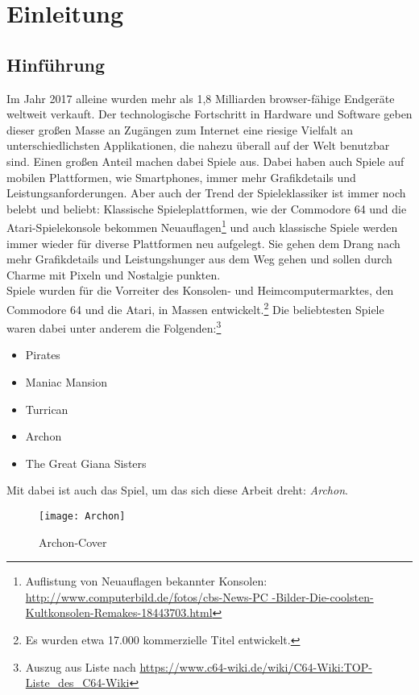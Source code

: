 \chapter{Einleitung}
\label{cha:Einleitung}

\section{Hinführung}
\label{sec:hinfuhrung}
Im Jahr 2017 alleine wurden mehr als 1,8 Milliarden browser-fähige Endgeräte weltweit verkauft.\cite{statista_absatz} Der technologische Fortschritt in Hardware und Software geben dieser großen Masse an Zugängen zum Internet eine riesige Vielfalt an unterschiedlichsten Applikationen, die nahezu überall auf der Welt benutzbar sind. Einen großen Anteil machen dabei Spiele aus. Dabei haben auch Spiele auf mobilen Plattformen, wie Smartphones, immer mehr Grafikdetails und Leistungsanforderungen. Aber auch der Trend der Spieleklassiker ist immer noch belebt und beliebt: Klassische Spieleplattformen, wie der Commodore 64 und die Atari-Spielekonsole bekommen Neuauflagen\footnote{Auflistung von Neuauflagen bekannter Konsolen:\\ \url{http://www.computerbild.de/fotos/cbs-News-PC
-Bilder-Die-coolsten-Kultkonsolen-Remakes-18443703.html}} und auch klassische Spiele werden immer wieder für diverse Plattformen neu aufgelegt. Sie gehen dem Drang nach mehr Grafikdetails und Leistungshunger aus dem Weg gehen und sollen durch Charme mit Pixeln und Nostalgie punkten.\\
Spiele wurden für die Vorreiter des Konsolen- und Heimcomputermarktes, den Commodore 64 und die Atari, in Massen entwickelt.\footnote{Es wurden etwa 17.000 kommerzielle Titel entwickelt.\cite{commodore64}}
Die beliebtesten Spiele waren dabei unter anderem die Folgenden:\footnote{Auszug aus Liste nach \url{https://www.c64-wiki.de/wiki/C64-Wiki:TOP-Liste_des_C64-Wiki}}
\begin{itemize}
	\item Pirates
	\item Maniac Mansion
	\item Turrican 
	\item Archon
	\item The Great Giana Sisters
\end{itemize}
Mit dabei ist auch das Spiel, um das sich diese Arbeit dreht: \emph{Archon}.
\begin{figure}[htp]
\centering
\captionsetup{justification=centering}
\texttt{[image: Archon]}
\caption[Archon - Cover]{Archon-Cover\footnotemark}
\label{fig:Archon_Cover}
\end{figure}
